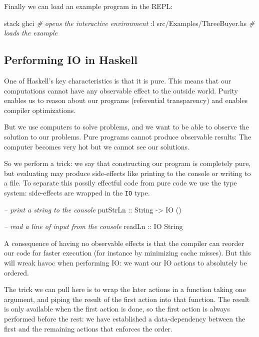 \documentclass[runningheads,plain]{llncs}
\newenvironment{Shaded}{}{}
\newcommand{\DataTypeTok}[1]{\textcolor[rgb]{0.56,0.13,0.00}{#1}}
\newcommand{\CommentTok}[1]{\textcolor[rgb]{0.38,0.63,0.69}{\textit{#1}}}
\newcommand{\OtherTok}[1]{\textcolor[rgb]{0.00,0.44,0.13}{#1}}
\newcommand{\ExtensionTok}[1]{#1}
\newcommand{\NormalTok}[1]{#1}
\begin{document}
Finally we can load an example program in the REPL:

\begin{Shaded}
\begin{Highlighting}[]
\ExtensionTok{stack}\NormalTok{ ghci }\CommentTok{# opens the interactive environment}
\NormalTok{:}\ExtensionTok{l}\NormalTok{ src/Examples/ThreeBuyer.hs }\CommentTok{# loads the example}
\end{Highlighting}
\end{Shaded}

\subsection{Performing IO in Haskell}\label{performing-io}

One of Haskell's key characteristics is that it is pure. This means that
our computations cannot have any observable effect to the outside world.
Purity enables us to reason about our programs (referential
transparency) and enables compiler optimizations.

But we use computers to solve problems, and we want to be able to
observe the solution to our problems. Pure programs cannot produce
observable results: The computer becomes very hot but we cannot see our
solutions.

So we perform a trick: we say that constructing our program is
completely pure, but evaluating may produce side-effects like printing
to the console or writing to a file. To separate this possily effectful
code from pure code we use the type system: side-effects are wrapped in
the \texttt{IO} type.

\begin{Shaded}
\begin{Highlighting}[]
\CommentTok{-- print a string to the console}
\NormalTok{putStrLn}\OtherTok{ ::} \DataTypeTok{String} \OtherTok{->} \DataTypeTok{IO}\NormalTok{ ()}

\CommentTok{-- read a line of input from the console}
\NormalTok{readLn}\OtherTok{ ::} \DataTypeTok{IO} \DataTypeTok{String}
\end{Highlighting}
\end{Shaded}

A consequence of having no observable effects is that the compiler can
reorder our code for faster execution (for instance by minimizing cache
misses). But this will wreak havoc when performing IO: we want our IO
actions to absolutely be ordered.

The trick we can pull here is to wrap the later actions in a function
taking one argument, and piping the result of the first action into that
function. The result is only available when the first action is done, so
the first action is always performed before the rest: we have
established a data-dependency between the first and the remaining
actions that enforces the order.
\end{document}
